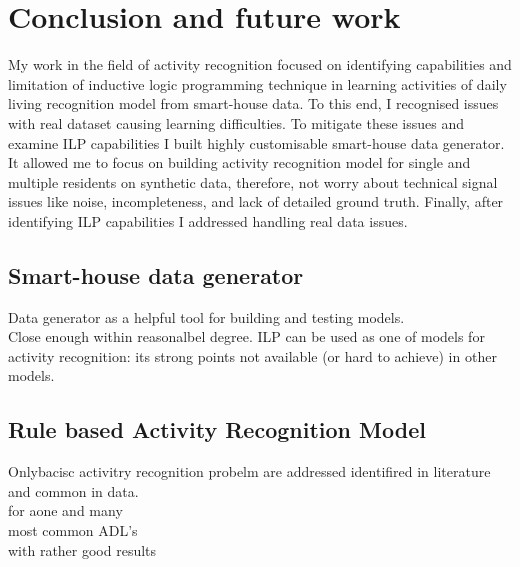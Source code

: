 \documentclass[11pt, a4paper, pdflatex, leqno, twoside, openright]{report}
\begin{document}



\chapter{Conclusion and future work\label{ch:summary}}
My work in the field of activity recognition focused on identifying capabilities and limitation of inductive logic programming technique in learning activities of daily living recognition model from smart-house data. To this end, I recognised issues with real dataset causing learning difficulties. To mitigate these issues and examine ILP capabilities I built highly customisable smart-house data generator. It allowed me to focus on building activity recognition model for single and multiple residents on synthetic data, therefore, not worry about technical signal issues like noise, incompleteness, and lack of detailed ground truth. Finally, after identifying ILP capabilities I addressed handling real data issues.

  \section{Smart-house data generator}
Data generator as a helpful tool for building and testing models.\\
Close enough within reasonalbel degree. ILP can be used as one of models for activity recognition: its strong points not available (or hard to achieve) in other models.\\

  \section{Rule based Activity Recognition Model}
Onlybacisc activitry recognition probelm are addressed identifired in literature and common in data.\\
for aone and many\\
most common ADL's\\
with rather good results
\end{document}
